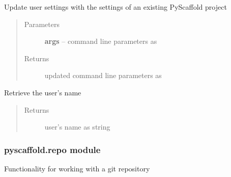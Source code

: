 \documentclass[letterpaper,10pt,english]{sphinxmanual}
\begin{document}

\begin{fulllineitems}
\label{_rst/pyscaffold:pyscaffold.info.project}
Update user settings with the settings of an existing PyScaffold project
\begin{quote}\begin{description}
\item[{Parameters}] \leavevmode
\textbf{args} -- command line parameters as \href{http://docs.python.org/2.7/library/argparse.html\#argparse.Namespace}{}

\item[{Returns}] \leavevmode
updated command line parameters as \href{http://docs.python.org/2.7/library/argparse.html\#argparse.Namespace}{}

\end{description}\end{quote}

\end{fulllineitems}


\begin{fulllineitems}
\label{_rst/pyscaffold:pyscaffold.info.username}
Retrieve the user's name
\begin{quote}\begin{description}
\item[{Returns}] \leavevmode
user's name as string

\end{description}\end{quote}

\end{fulllineitems}



\subsubsection{pyscaffold.repo module}
\label{_rst/pyscaffold:module-pyscaffold.repo}\label{_rst/pyscaffold:pyscaffold-repo-module}
Functionality for working with a git repository
\end{document}
